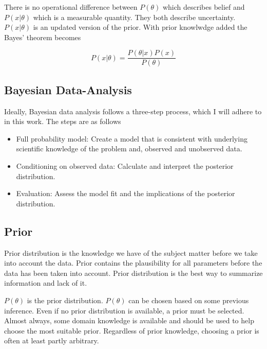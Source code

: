 There is no operational difference between $P(\theta)$ which describes belief and $P(x|\theta)$ which is a measurable quantity. They both describe uncertainty. $P(x|\theta)$ is an updated version of the prior. With prior knowlwdge added the Bayes' theorem becomes

\begin{equation}
P(x|\theta) = \frac{P(\theta|x)P(x)}{P(\theta)}
\end{equation}
\cite{Pawitan2002InAL}

\subsection{Bayesian Data-Analysis}
Ideally, Bayesian data analysis follows a three-step process, which I will adhere to in this work. The steps are as follows

\begin{itemize}
    \item Full probability model: Create a model that is consistent with underlying scientific knowledge of the problem and, observed and unobserved data. 
    \item Conditioning on observed data: Calculate and interpret the posterior distribution.
    \item Evaluation: Assess the model fit and the implications of the posterior distribution.
\end{itemize} \cite{Gel2014BayesianDA}

\subsection{Prior}\label{Prior}

Prior distribution is the knowledge we have of the subject matter before we take into account the data.\cite{Box1973BayesianII} Prior contains the plausibility for all parameters before the data has been taken into account. \cite{Mcelreath2015StatisticalRA}\cite{Robert2007TheBC} Prior distribution is the best way to summarize information and lack of it.\cite{Robert2007TheBC}


$P(\theta)$ is the prior distribution. $P(\theta)$ can be chosen based on some previous inference. Even if no prior distribution is available, a prior must be selected. Almost always, some domain knowledge is available and should be used to help choose the most suitable prior.\cite{Mcelreath2015StatisticalRA} Regardless of prior knowledge, choosing a prior is often at least partly arbitrary.\cite{Robert2007TheBC}

